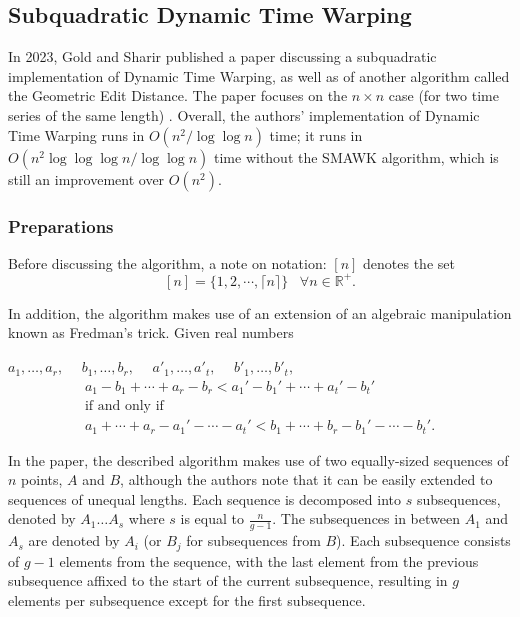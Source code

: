 \subsection{Subquadratic Dynamic Time Warping}
In 2023, Gold and Sharir published a paper discussing a subquadratic implementation of Dynamic Time Warping, as well as of another algorithm called the Geometric Edit Distance. The paper focuses on the $n\times n$ case (for two time series of the same length) \cite{OmerGold}. Overall, the authors' implementation of Dynamic Time Warping runs in $O(n^2 /\log\log n)$ time; it runs in $O(n^2 \log \log \log{n}/\log\log{n} )$ time without the SMAWK algorithm, which is still an improvement over $O(n^2)$.

\subsubsection{Preparations}
Before discussing the algorithm, a note on notation: $[n]$ denotes the set
\[[n]=\{1,2,\cdots,\lceil n\rceil\}\hspace{10pt}\forall n\in\mathbb{R}^+.\]

In addition, the algorithm makes use of an  extension of an algebraic manipulation known as Fredman's trick. Given real numbers

\noindent$a_1,\dots,a_r,\hspace{15pt}b_1,\dots ,b_r,\hspace{15pt}a'_1,\dots ,a'_t,\hspace{15pt}b'_1,\dots,b'_t,$
\begin{gather*}
    a_1-b_1+\cdots+a_r-b_r<a_1'-b_1'+\cdots+a_t'-b_t'\\
    \text{if and only if}\\
    a_1+\cdots+a_r-a_1'-\cdots-a_t'<b_1+\cdots+b_r-b_1'-\cdots-b_t'.
\end{gather*}

In the paper, the described algorithm makes use of two equally-sized sequences of $n$ points, $A$ and $B$, although the authors note that it can be easily extended to sequences of unequal lengths. Each sequence is decomposed into $s$ subsequences, denoted by $A_1\dots A_s$ where $s$ is equal to $\frac{n}{g-1}$. The subsequences in between $A_1$ and $A_s$ are denoted by $A_i$ (or $B_j$ for subsequences from $B$). Each subsequence consists of $g-1$ elements from the sequence, with the last element from the previous subsequence affixed to the start of the current subsequence, resulting in $g$ elements per subsequence except for the first subsequence.

